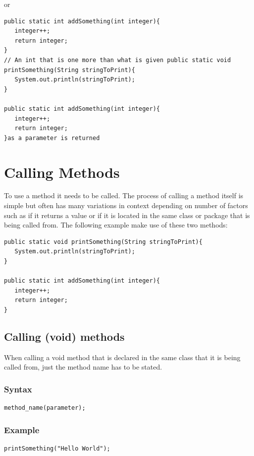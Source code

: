 \documentclass[a4paper]{article}
\begin{document}
or

\begin{lstlisting}
public static int addSomething(int integer){
   integer++;
   return integer;
}
// An int that is one more than what is given public static void printSomething(String stringToPrint){
   System.out.println(stringToPrint);
}

public static int addSomething(int integer){
   integer++;
   return integer;
}as a parameter is returned
\end{lstlisting}

\section*{Calling Methods}

To use a method it needs to be called. The process of calling a method itself is simple but often has many variations in context depending on number of factors such as if it returns a value or if it is located in the same class or package that is being called from. The following example make use of these two methods:

\begin{lstlisting}
public static void printSomething(String stringToPrint){
   System.out.println(stringToPrint);
}

public static int addSomething(int integer){
   integer++;
   return integer;
}
\end{lstlisting}

\subsection*{Calling (void) methods}
When calling a void method that is declared in the same class that it is being called from, just the method name has to be stated.

\subsubsection*{Syntax}
\begin{lstlisting}
method_name(parameter);
\end{lstlisting}

\subsubsection*{Example}
\begin{lstlisting}
printSomething("Hello World");
\end{lstlisting}
\end{document}
